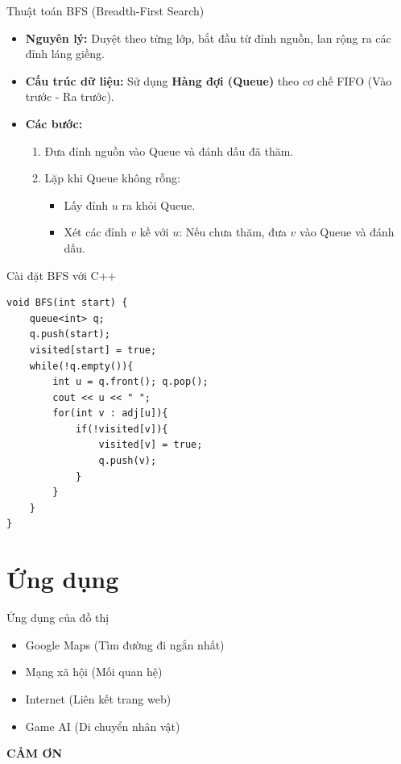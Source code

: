 \documentclass{beamer}
\begin{document}
\begin{frame}{Thuật toán BFS (Breadth-First Search)}
    \begin{itemize}
        \item \textbf{Nguyên lý:} Duyệt theo từng lớp, bắt đầu từ đỉnh nguồn, lan rộng ra các đỉnh láng giềng.
        \item \textbf{Cấu trúc dữ liệu:} Sử dụng \textbf{Hàng đợi (Queue)} theo cơ chế FIFO (Vào trước - Ra trước).
        \item \textbf{Các bước:}
        \begin{enumerate}
            \item Đưa đỉnh nguồn vào Queue và đánh dấu đã thăm.
            \item Lặp khi Queue không rỗng:
            \begin{itemize}
                \item Lấy đỉnh $u$ ra khỏi Queue.
                \item Xét các đỉnh $v$ kề với $u$: Nếu chưa thăm, đưa $v$ vào Queue và đánh dấu.
            \end{itemize}
        \end{enumerate}
    \end{itemize}
\end{frame}

\begin{frame}[fragile]{Cài đặt BFS với C++}
\begin{verbatim}
void BFS(int start) {
    queue<int> q;
    q.push(start);
    visited[start] = true;
    while(!q.empty()){
        int u = q.front(); q.pop();
        cout << u << " ";
        for(int v : adj[u]){
            if(!visited[v]){
                visited[v] = true;
                q.push(v);
            }
        }
    }
}
\end{verbatim}
\end{frame}


\section{Ứng dụng}
\begin{frame}{Ứng dụng của đồ thị}
\begin{itemize}
\item Google Maps (Tìm đường đi ngắn nhất)
\item Mạng xã hội (Mối quan hệ)
\item Internet (Liên kết trang web)
\item Game AI (Di chuyển nhân vật)
\end{itemize}
\end{frame}

\begin{frame}
\centering
\Huge \textbf{CẢM ƠN}
\end{frame}
\end{document}
